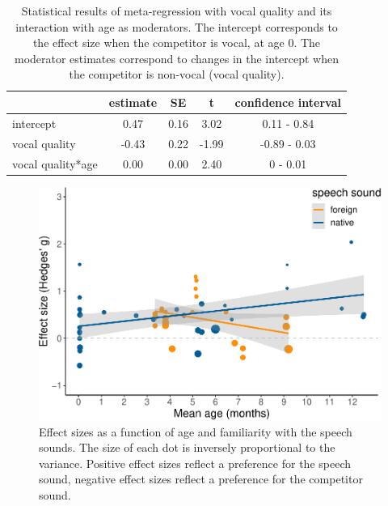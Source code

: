 \documentclass[
  english,
  man]{apa6}
\begin{document}
\begin{table}[tbp]

\begin{center}
\begin{threeparttable}

\caption{\label{tab:TableVocal}Statistical results of meta-regression with vocal quality and its interaction with age as moderators. The intercept corresponds to the effect size when the competitor is vocal, at age 0. The moderator estimates correspond to changes in the intercept when the competitor is non-vocal (vocal quality).}

\begin{tabular}{lcccc}
\toprule
 & estimate & SE & t & confidence interval\\
\midrule
intercept & 0.47 & 0.16 & 3.02 & 0.11 - 0.84\\
vocal quality & -0.43 & 0.22 & -1.99 & -0.89 - 0.03\\
vocal quality*age & 0.00 & 0.00 & 2.40 & 0 - 0.01\\
\bottomrule
\end{tabular}

\end{threeparttable}
\end{center}

\end{table}

\begin{figure}
\centering
\includegraphics{MA_speech_pref_files/figure-latex/lang-1.pdf}
\caption{\label{fig:lang}Effect sizes as a function of age and familiarity with the speech sounds. The size of each dot is inversely proportional to the variance. Positive effect sizes reflect a preference for the speech sound, negative effect sizes reflect a preference for the competitor sound.}
\end{figure}
\end{document}
